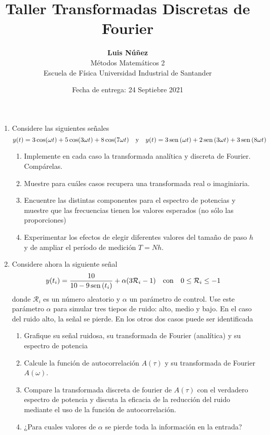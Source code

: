 \documentclass[11pt]{article}
\title{Taller Transformadas Discretas de Fourier}
\author{{\bf Luis Núñez} \\ Métodos Matemáticos 2 \\ 
Escuela de Física Universidad Industrial de Santander
}
\date{Fecha de entrega: 24 Septiebre 2021}
\begin{document}
\maketitle

\begin{enumerate}
    \item Considere las siguientes señales
    \[y(t)=3 \cos (\omega t) + 5 \cos (3 \omega t) +8\cos (7 \omega t) 
    \quad {\rm y } \quad y(t)= 3\,{\rm sen}\,(\omega t) +2\,{\rm sen}\,(3 \omega t) +3\,{\rm sen}\, (8 \omega t)
    \] 
    \begin{enumerate}
        \item Implemente en cada caso la transformada analítica y discreta de Fourier. Compárelas.
        \item Muestre para cuáles casos recupera una transformada real o imaginiaria.
        \item Encuentre las distintas componentes para el espectro de potencias y muestre que las frecuencias tienen los valores esperados (no sólo las proporciones)
        \item Experimentar los efectos de elegir diferentes valores del tamaño de paso $h$ y de ampliar el período de medición $T=N h$.
    \end{enumerate}
    \item Considere ahora la siguiente señal
    \[ y(t_i) = \frac{10}{10 - 9\,{\rm sen}\,(t_i)} 
    + \alpha(3 \mathcal{R}_i -1) \quad {\rm con} \quad 0 \leq \mathcal{R}_i \leq -1\]
    donde $\mathcal{R}_i$ es un número aleatorio y $\alpha$ un parámetro de control. Use este parámetro $\alpha$ para simular tres tiepos de ruido: alto, medio y bajo. En el caso del ruido alto, la señal se pierde. En los otros dos casos puede ser identificada
    \begin{enumerate}
        \item Grafique su señal ruidosa, su transformada de Fourier (analítica) y su espectro de potencia
        \item Calcule la función de autocorrelación $A(\tau)$ y su transformada de Fourier $A(\omega)$.
        \item Compare la transformada discreta de fourier de $A(\tau)$ con el verdadero espectro de potencia y discuta la eficacia de la reducción del ruido mediante el uso de la función de autocorrelación.
        \item ¿Para cuales valores de $\alpha$ se pierde toda la información en la entrada?
    \end{enumerate}
    
    
\end{enumerate}
\end{document}

